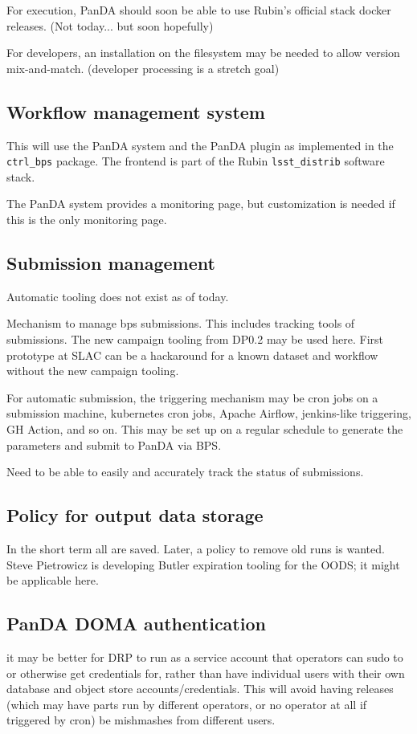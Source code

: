 For execution,
PanDA should soon be able to use Rubin's official stack docker releases.
(Not today... but soon hopefully)

For developers, an installation on the filesystem may be needed to allow version mix-and-match. (developer processing is a stretch goal)
 
\subsection{Workflow management system}
This will use the PanDA system and the PanDA plugin as implemented in the \texttt{ctrl\_bps} package.
The frontend is part of the Rubin \texttt{lsst\_distrib} software stack.

The PanDA system provides a monitoring page, but customization is needed if this is the only monitoring page.

\subsection{Submission management}
Automatic tooling does not exist as of today. 

Mechanism to manage bps submissions. This includes tracking tools of submissions.
The new campaign tooling from DP0.2 may be used here.
First prototype at SLAC can be a hackaround for a known dataset and workflow without the new campaign tooling.

For automatic submission, the triggering mechanism may be cron jobs on a submission machine, kubernetes cron jobs, Apache Airflow, jenkins-like triggering, GH Action, and so on.
This may be set up on a regular schedule to generate the parameters and submit to PanDA via BPS. 

Need to be able to easily and accurately track the status of submissions.

\subsection{Policy for output data storage}
In the short term all are saved.
Later, a policy to remove old runs is wanted.
Steve Pietrowicz is developing Butler expiration tooling for the OODS;  it might be applicable here.

\subsection{PanDA DOMA authentication}
it may be better for DRP to run as a service account that operators can sudo to or otherwise get credentials for, rather than have individual users with their own database and object store accounts/credentials.  This will avoid having releases (which may have parts run by different operators, or no operator at all if triggered by cron) be mishmashes from different users.

